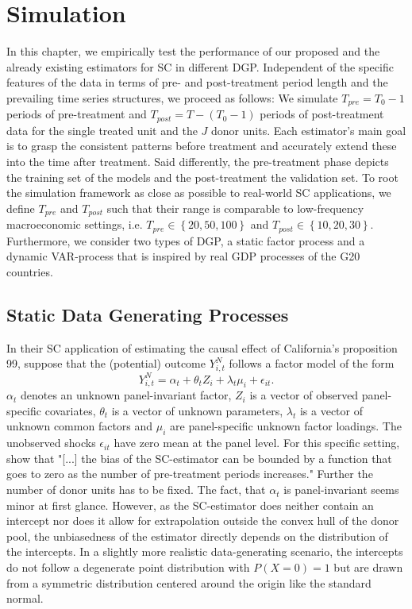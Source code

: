 \section{Simulation}
In this chapter, we empirically test the performance of our proposed and the already existing estimators for \ac{SC} in different \ac{DGP}. Independent of the specific features of the data in terms of pre- and post-treatment period length and the prevailing time series structures, we proceed as follows: We simulate $T_{pre} = T_0 -1$ periods of pre-treatment and $T_{post} = T - (T_0 -1)$ periods of post-treatment data for the single treated unit and the $J$ donor units. Each estimator's main goal is to grasp the consistent patterns before treatment and accurately extend these into the time after treatment. Said differently, the pre-treatment phase depicts the training set of the models and the post-treatment the validation set. To root the simulation framework as close as possible to real-world \ac{SC} applications, we define $T_{pre}$ and $T_{post}$ such that their range is comparable to low-frequency macroeconomic settings, i.e. $T_{pre} \in \left\lbrace 20,50,100\right\rbrace $ and $T_{post} \in \left\lbrace 10,20,30\right\rbrace$. Furthermore, we consider two types of \ac{DGP}, a static factor process and a dynamic \ac{VAR}-process that is inspired by real \ac{GDP} processes of the G20 countries.

\subsection{Static Data Generating Processes}

In their \ac{SC} application of estimating the causal effect of California's proposition 99, \cite{abadie:2010} suppose that the (potential) outcome $Y_{i,t}^{N}$ follows a factor model of the  form 
\begin{equation*}
	Y_{i,t}^{N} = \alpha_t + \theta_t Z_i + \lambda_t \mu_i + \epsilon_{it}.
\end{equation*}
$\alpha_t$ denotes an unknown panel-invariant factor, $Z_i$ is a vector of observed panel-specific covariates, $\theta_t$ is a vector of unknown parameters, $\lambda_t$ is a vector of unknown common factors and $\mu_i$ are panel-specific unknown factor loadings. The unobserved shocks $\epsilon_{it}$ have zero mean at the panel level. 
For this specific setting, \cite{abadie:2010} show that "[...] the bias of the SC-estimator can be bounded by a function that goes to zero as the number of pre-treatment periods increases." Further the number of donor units has to be fixed. The fact, that $\alpha_t$ is panel-invariant seems minor at first glance. However, as the \ac{SC}-estimator does neither contain an intercept nor does it allow for extrapolation outside the convex hull of the donor pool, the unbiasedness of the estimator directly depends on the distribution of the intercepts. In a slightly more realistic data-generating scenario, the intercepts do not follow a degenerate point distribution with $P(X = 0) = 1$ but are drawn from a symmetric distribution centered around the origin like the standard normal. 

